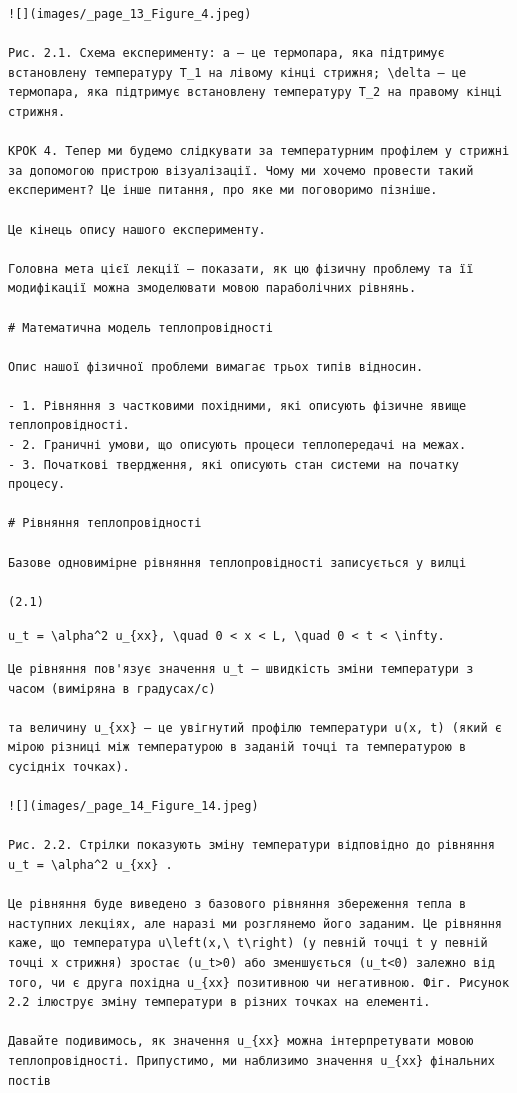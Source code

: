 \documentclass[
  ukrainian,
]{article}
\begin{document}
\begin{verbatim}
![](images/_page_13_Figure_4.jpeg)

Рис. 2.1. Схема експерименту: a — це термопара, яка підтримує встановлену температуру T_1 на лівому кінці стрижня; \delta — це термопара, яка підтримує встановлену температуру T_2 на правому кінці стрижня.

КРОК 4. Тепер ми будемо слідкувати за температурним профілем у стрижні за допомогою пристрою візуалізації. Чому ми хочемо провести такий експеримент? Це інше питання, про яке ми поговоримо пізніше.

Це кінець опису нашого експерименту.

Головна мета цієї лекції — показати, як цю фізичну проблему та її модифікації можна змоделювати мовою параболічних рівнянь.

# Математична модель теплопровідності

Опис нашої фізичної проблеми вимагає трьох типів відносин.

- 1. Рівняння з частковими похідними, які описують фізичне явище теплопровідності.
- 2. Граничні умови, що описують процеси теплопередачі на межах.
- 3. Початкові твердження, які описують стан системи на початку процесу.

# Рівняння теплопровідності

Базове одновимірне рівняння теплопровідності записується у вилці

(2.1)
\end{verbatim}

\texttt{u\_t\ =\ \textbackslash{}alpha\^{}2\ u\_\{xx\},\ \textbackslash{}quad\ 0\ \textless{}\ x\ \textless{}\ L,\ \textbackslash{}quad\ 0\ \textless{}\ t\ \textless{}\ \textbackslash{}infty.}

\begin{verbatim}
Це рівняння пов'язує значення u_t — швидкість зміни температури з часом (виміряна в градусах/с)

та величину u_{xx} — це увігнутий профілю температури u(x, t) (який є мірою різниці між температурою в заданій точці та температурою в сусідніх точках).

![](images/_page_14_Figure_14.jpeg)

Рис. 2.2. Стрілки показують зміну температури відповідно до рівняння u_t = \alpha^2 u_{xx} .

Це рівняння буде виведено з базового рівняння збереження тепла в наступних лекціях, але наразі ми розглянемо його заданим. Це рівняння каже, що температура u\left(x,\ t\right) (у певній точці t у певній точці x стрижня) зростає (u_t>0) або зменшується (u_t<0) залежно від того, чи є друга похідна u_{xx} позитивною чи негативною. Фіг. Рисунок 2.2 ілюструє зміну температури в різних точках на елементі.

Давайте подивимось, як значення u_{xx} можна інтерпретувати мовою теплопровідності. Припустимо, ми наблизимо значення u_{xx} фінальних постів
\end{verbatim}
\end{document}
